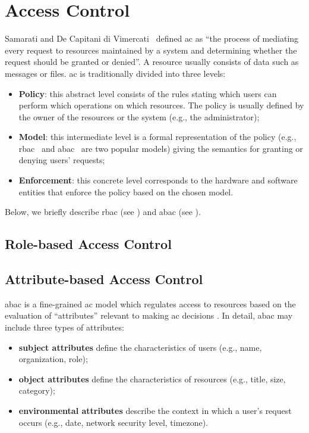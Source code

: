 \section{Access Control}\label{future_sec:access_control}
\vspace{7.5cm}

Samarati and De Capitani di Vimercati~\cite{samarati_access_2000} defined \gls{ac} as ``the process of mediating every request to resources maintained by a system and determining whether the request should be granted or denied''. A resource usually consists of data such as messages or files. \gls{ac} is traditionally divided into three levels:
\begin{itemize}
	\item\textbf{Policy}: this abstract level consists of the rules stating which users can perform which operations on which resources. The policy is usually defined by the owner of the resources or the system (e.g., the administrator);
	\item\textbf{Model}: this intermediate level is a formal representation of the policy (e.g., \gls{rbac}~\cite{sandhu_access_1998} and \gls{abac}~\cite{horwitz_toward_2002} are two popular models) giving the semantics for granting or denying users' requests;
	\item\textbf{Enforcement}: this concrete level corresponds to the hardware and software entities that enforce the policy based on the chosen model.
\end{itemize}

Below, we briefly describe \gls{rbac} (see ) and \gls{abac} (see ).


\subsection{Role-based Access Control}\label{future_sec:access_control:rbac}



\subsection{Attribute-based Access Control}\label{future_sec:access_control:abac}


\gls{abac} is a fine-grained \gls{ac} model which regulates access to resources based on the evaluation of ``attributes'' relevant to making \gls{ac} decisions \cite{horwitz_toward_2002}. In detail, \gls{abac} may include three types of attributes: 
\begin{itemize}
	\item \textbf{subject attributes} define the characteristics of users (e.g., name, organization, role);
	\item \textbf{object attributes} define the characteristics of resources (e.g., title, size, category);
	\item \textbf{environmental attributes} describe the context in which a user's request occurs (e.g., date, network security level, timezone).
\end{itemize}

